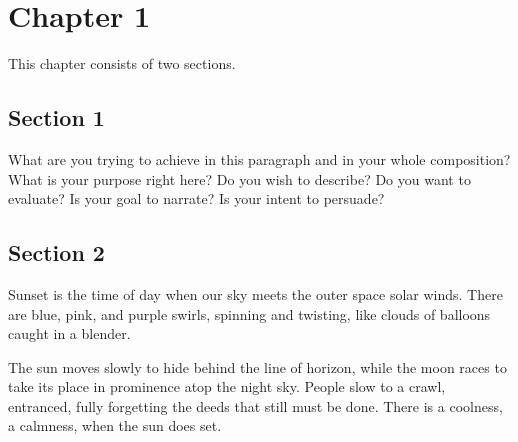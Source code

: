\chapter{Chapter 1}
\label{chapter:1}

This chapter consists of two sections.

\section{Section 1}
\label{section:1}

What are you trying to achieve in this paragraph and in your whole composition? What is your purpose right here? Do you wish to describe? Do you want to evaluate? Is your goal to narrate? Is your intent to persuade?

\section{Section 2}
\label{section:2}

Sunset is the time of day when our sky meets the outer space solar winds. There are blue, pink, and purple swirls, spinning and twisting, like clouds of balloons caught in a blender. 

The sun moves slowly to hide behind the line of horizon, while the moon races to take its place in prominence atop the night sky. People slow to a crawl, entranced, fully forgetting the deeds that still must be done. There is a coolness, a calmness, when the sun does set.

